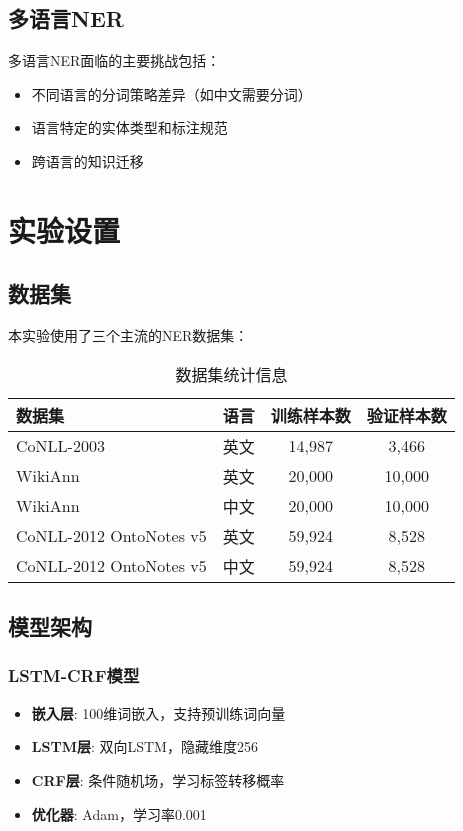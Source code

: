 \documentclass{article}
\begin{document}
\subsection{多语言NER}
多语言NER面临的主要挑战包括：
\begin{itemize}
    \item 不同语言的分词策略差异（如中文需要分词）
    \item 语言特定的实体类型和标注规范
    \item 跨语言的知识迁移
\end{itemize}

\section{实验设置}

\subsection{数据集}

本实验使用了三个主流的NER数据集：

\begin{table}[H]
\centering
\caption{数据集统计信息}
\begin{tabular}{lccc}
\toprule
数据集 & 语言 & 训练样本数 & 验证样本数 \\
\midrule
CoNLL-2003 & 英文 & 14,987 & 3,466 \\
WikiAnn & 英文 & 20,000 & 10,000 \\
WikiAnn & 中文 & 20,000 & 10,000 \\
CoNLL-2012 OntoNotes v5 & 英文 & 59,924 & 8,528 \\
CoNLL-2012 OntoNotes v5 & 中文 & 59,924 & 8,528 \\
\bottomrule
\end{tabular}
\end{table}

\subsection{模型架构}

\subsubsection{LSTM-CRF模型}
\begin{itemize}
    \item \textbf{嵌入层}: 100维词嵌入，支持预训练词向量
    \item \textbf{LSTM层}: 双向LSTM，隐藏维度256
    \item \textbf{CRF层}: 条件随机场，学习标签转移概率
    \item \textbf{优化器}: Adam，学习率0.001
\end{itemize}
\end{document}
